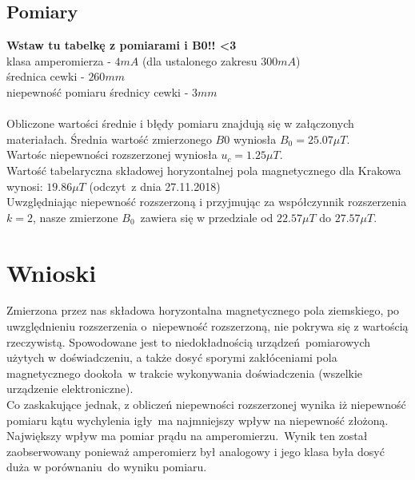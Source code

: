 \documentclass[11pt]{article}
\begin{document}
\subsection{Pomiary}
\textbf{Wstaw tu tabelkę z pomiarami i B0!! <3}\\
klasa amperomierza - $4mA$ (dla ustalonego zakresu $300mA$)\\
średnica cewki - $260mm$\\
niepewność pomiaru średnicy cewki - $3mm$\\
\\
Obliczone wartości średnie i błędy pomiaru znajdują się w załączonych materiałach.
Średnia wartość zmierzonego $B{0}$ wyniosła $B_{0} = 25.07\mu T$.\\
Wartośc niepewności rozszerzonej wyniosła $u_{c} = 1.25\mu T$.\\
Wartość tabelaryczna składowej horyzontalnej pola magnetycznego dla Krakowa wynosi: $19.86\mu T$ (odczyt\
z dnia 27.11.2018)\\ 
Uwzględniając niepewność rozszerzoną i przyjmując za współczynnik rozszerzenia $k = 2$, nasze zmierzone $B_{0}$\
zawiera się w przedziale od $22.57\mu T$ do $27.57 \mu T$.
\section{Wnioski}
Zmierzona przez nas składowa horyzontalna magnetycznego pola ziemskiego, po uwzględnieniu rozszerzenia o\
niepewność rozszerzoną, nie pokrywa się z wartością rzeczywistą. Spowodowane jest to niedokładnością urządzeń\
pomiarowych użytych w doświadczeniu, a także dosyć sporymi zakłóceniami pola magnetycznego dookoła\
w trakcie wykonywania doświadczenia (wszelkie urządzenie elektroniczne).\\
Co zaskakujące jednak, z obliczeń niepewności rozszerzonej wynika iż niepewność pomiaru kątu wychylenia igły\
ma najmniejszy wpływ na niepewność złożoną. Największy wpływ ma pomiar prądu na amperomierzu.\
Wynik ten został zaobserwowany ponieważ amperomierz był analogowy i jego klasa była dosyć duża w porównaniu\
do wyniku pomiaru.
\end{document}
